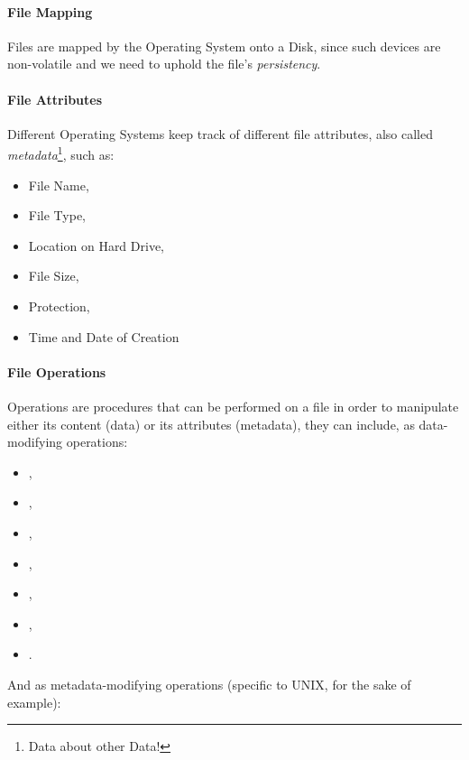 \documentclass[openright, twoside]{report}
\theoremstyle{definition}
\theoremstyle{example}
\begin{document}
\paragraph{File Mapping}
Files are mapped by the Operating System onto a Disk, since such devices are non-volatile and 
we need to uphold the file's \emph{persistency}.

\paragraph{File Attributes}
Different Operating Systems keep track of different file attributes, also called 
\emph{metadata}\footnote{Data about other Data!}, such as:

\begin{multicols}{2}
	\begin{itemize}
		\item File Name,
		\item File Type,
		\item Location on Hard Drive,
		\item File Size,
		\item Protection,
		\item Time and Date of Creation
	\end{itemize}
\end{multicols}

\paragraph{File Operations}
\label{par:fops1}
Operations are procedures that can be performed on a file in order to manipulate 
either its content (data) or its attributes (metadata),
they can include, as data-modifying operations:

\begin{multicols}{2}
	\begin{itemize}
		\item {},
		\item {},
		\item {},
		\item {},
		\item {},
		\item {},
		\item {}.
	\end{itemize}
\end{multicols}

And as metadata-modifying operations (specific to UNIX, for the sake of example):
\end{document}
